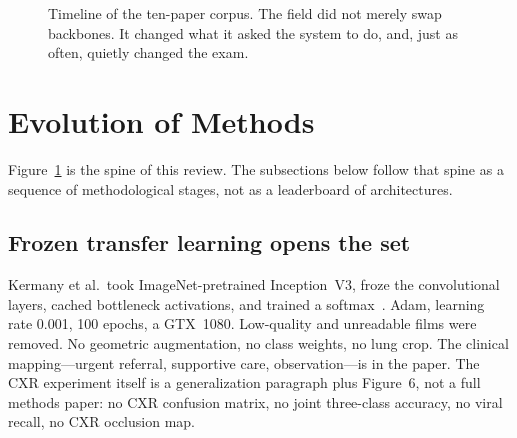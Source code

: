 \documentclass[11pt,a4paper]{article}
\begin{document}
\begin{figure}[t]
\centering
{}
\caption{Timeline of the ten-paper corpus. The field did not merely swap backbones. It changed what it asked the system to do, and, just as often, quietly changed the exam.}
\label{fig:timeline}
\end{figure}

\section{Evolution of Methods}
\label{sec:evolution}
Figure~\ref{fig:timeline} is the spine of this review. The subsections below follow that spine as a sequence of methodological stages, not as a leaderboard of architectures.

\subsection{Frozen transfer learning opens the set}
Kermany et al.\ took ImageNet-pretrained Inception~V3, froze the convolutional layers, cached bottleneck activations, and trained a softmax~\cite{kermany2018}. Adam, learning rate 0.001, 100 epochs, a GTX~1080. Low-quality and unreadable films were removed. No geometric augmentation, no class weights, no lung crop. The clinical mapping---urgent referral, supportive care, observation---is in the paper. The CXR experiment itself is a generalization paragraph plus Figure~6, not a full methods paper: no CXR confusion matrix, no joint three-class accuracy, no viral recall, no CXR occlusion map.
\end{document}
